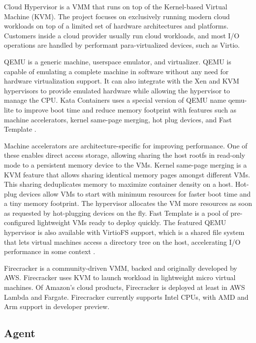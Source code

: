 Cloud Hypervisor is a VMM that runs on top of the Kernel-based Virtual Machine (KVM). The project focuses on exclusively running modern cloud workloads on top of a limited set of hardware architectures and platforms. Customers inside a cloud provider usually run cloud workloads, and most I/O operations are handled by performant para-virtualized devices, such as Virtio. \cite{CloudHypervisor}

QEMU is a generic machine, userspace emulator, and virtualizer. QEMU is capable of emulating a complete machine in software without any need for hardware virtualization support. It can also integrate with the Xen and KVM hypervisors to provide emulated hardware while allowing the hypervisor to manage the CPU. Kata Containers uses a special version of QEMU name qemu-lite to improve boot time and reduce memory footprint with features such as machine accelerators, kernel same-page merging, hot plug devices, and Fast Template \cite{Randazzo2019}. \cite{QEMUGithub}\cite{QEMU}

Machine accelerators are architecture-specific for improving performance. One of these enables direct access storage, allowing sharing the host rootfs in read-only mode to a persistent memory device to the VMs. Kernel same-page merging is a KVM feature that allows sharing identical memory pages amongst different VMs. This sharing deduplicates memory to maximize container density on a host. Hot-plug devices allow VMs to start with minimum resources for faster boot time and a tiny memory footprint. The hypervisor allocates the VM more resources as soon as requested by hot-plugging devices on the fly. Fast Template is a pool of pre-configured lightweight VMs ready to deploy quickly. The featured QEMU hypervisor is also available with VirtioFS support, which is a shared file system that lets virtual machines access a directory tree on the host, accelerating I/O performance in some context \cite{virtio-fs}. \cite{Randazzo2019}

Firecracker is a community-driven VMM, backed and originally developed by AWS. Firecracker uses KVM to launch workload in lightweight micro virtual machines. Of Amazon's cloud products, Firecracker is deployed at least in AWS Lambda and Fargate. Firecracker currently supports Intel CPUs, with AMD and Arm support in developer preview. \cite{AWS}\cite{FirecrackerDesign}\cite{Debab2021}

\subsection{Agent}

